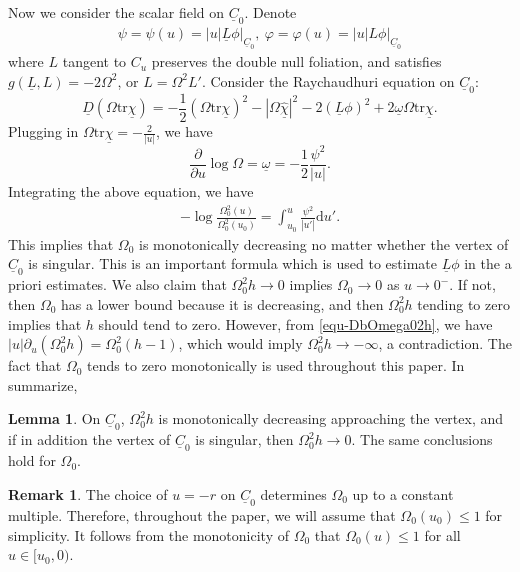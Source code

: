 \documentclass[11pt,reqno]{amsart}
\theoremstyle{definition}
\newtheorem{lemma}{Lemma}[section]
\newtheorem{remark}{Remark}[section]
\numberwithin{equation}{section}
\newcommand{\D}{\mathrm{d}}
\newcommand{\tr}{\mathrm{tr}}
\def\chib{\underline{\chi}}
\def\chibh{\widehat{\underline{\chi}}}
\def\Lb{\underline{L}}
\def\tr{\mathrm{tr}}
\def\omegab{\underline{\omega}}
\def\Cb{\underline{C}}
\newcommand{\Db}{\underline{D}}
\begin{document}
Now we consider the scalar field on $\Cb_0$. Denote
\begin{align*}
\psi=\psi(u)=|u|\Lb\phi\Big|_{\Cb_0},\ \varphi=\varphi(u)=|u|L\phi\Big|_{\Cb_0}
\end{align*}
where $L$ tangent to $C_u$ preserves the double null foliation, and satisfies $g(\Lb,L)=-2\Omega^2$, or $L=\Omega^2L'$. Consider the Raychaudhuri equation on $\Cb_0$:
$$\Db(\Omega\tr\chib)=-\frac{1}{2}(\Omega\tr\chib)^2-|\Omega\chibh|^2-2(\Lb\phi)^2+2\omegab\Omega\tr\chib.$$
Plugging in $\Omega\tr\chib=-\frac{2}{|u|}$,
we have
$$\frac{\partial}{\partial u}\log\Omega=\omegab=-\frac{1}{2}\frac{\psi^2}{|u|}.$$
Integrating the above equation, we have
\begin{align}\label{Lbphi}-\log\frac{\Omega_0^2(u)}{\Omega_0^2(u_0)}=\int_{u_0}^u\frac{\psi^2}{|u'|}\D u'.\end{align}
This implies that $\Omega_0$ is monotonically decreasing no matter whether the vertex of $\Cb_0$ is singular. This is an important formula which is used to estimate $\Lb\phi$ in the a priori estimates. We also claim that $\Omega_0^2h\to0$ implies $\Omega_0\to0$ as $u\to 0^-$. If not, then $\Omega_0$ has a lower bound because it is decreasing, and then $\Omega_0^2h$ tending to zero implies that $h$ should tend to zero. However, from \eqref{equ-DbOmega02h},  we have $|u|\partial_u(\Omega_0^2h)=\Omega_0^2(h-1)$, which would imply $\Omega_0^2h\to-\infty$, a contradiction. The fact that $\Omega_0$ tends to zero monotonically is used throughout this paper. In summarize, 
\begin{lemma}\label{Omega_0to0}
On $\Cb_0$, $\Omega_0^2h$ is monotonically decreasing approaching the vertex, and if in addition the vertex of $\Cb_0$ is singular, then $\Omega_0^2h\to0$. The same conclusions hold for $\Omega_0$.
\end{lemma}
\begin{remark}
The choice of $u=-r$ on $\Cb_0$ determines $\Omega_0$ up to a constant multiple. Therefore, throughout the paper, we will assume that $\Omega_0(u_0)\le1$ for simplicity. It follows from the monotonicity of $\Omega_0$ that $\Omega_0(u)\le1$ for all $u\in[u_0,0)$.
\end{remark}
\begin{comment}
\begin{remark}
Another frequently used choice of the coordinate $u$ on $\Cb_0$ is to fix $\Omega_0\equiv1$ on $\Cb_0$. Then $\omegab\equiv0$ on $\Cb_0$ and $\tr\chib$ on $\Cb_0$ satisfies
\begin{align*}
\frac{\partial}{\partial u}\tr\chib=-\frac{1}{2}(\tr\chib)^2-\frac{2\psi^2}{|u|^2}
\end{align*}
and in particular not equals to $-\frac{2}{|u|}$ in general. We believe that this choice of the coordinate system also works but is apparently more difficult to deal with than the choice such that $u=-r$ on $\Cb_0$.
\end{remark}
\end{comment}
\end{document}

